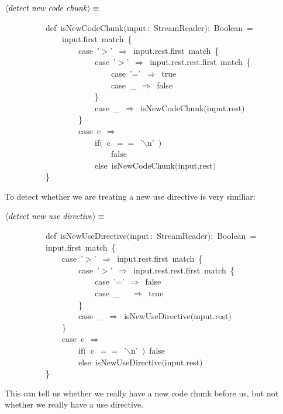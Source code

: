 \documentclass[a4paper,12pt]{article}
\begin{document}
$\left<\mbox{\emph{detect new code chunk}}\right>\equiv$
\begin{program}~~~~~~~~~~{\vem def}~isNewCodeChunk$($input\,{\rm :}~StreamReader$)${\rm :}~Boolean~=
\\~~~~~~~~~~~~~~input.first~{\vem match}~{\small\{}
\\~~~~~~~~~~~~~~~~~~{\vem case}~'$>$'~$\Rightarrow$~input.rest.first~{\vem match}~{\small\{}
\\~~~~~~~~~~~~~~~~~~~~~~{\vem case}~'$>$'~$\Rightarrow$~input.rest.rest.first~{\vem match}~{\small\{}
\\~~~~~~~~~~~~~~~~~~~~~~~~~~{\vem case}~'='~$\Rightarrow$~{\vem true}
\\~~~~~~~~~~~~~~~~~~~~~~~~~~{\vem case}~\_~$\Rightarrow$~{\vem false}
\\~~~~~~~~~~~~~~~~~~~~~~{\small\}}
\\~~~~~~~~~~~~~~~~~~~~~~{\vem case}~\_~$\Rightarrow$~isNewCodeChunk$($input.rest$)$
\\~~~~~~~~~~~~~~~~~~{\small\}}
\\~~~~~~~~~~~~~~~~~~{\vem case}~c~$\Rightarrow$
\\~~~~~~~~~~~~~~~~~~~~~~{\vem if}$($~c~$==$~'$\backslash$n'~$)$
\\~~~~~~~~~~~~~~~~~~~~~~~~~~{\vem false}
\\~~~~~~~~~~~~~~~~~~~~~~{\vem else}~isNewCodeChunk$($input.rest$)$
\\~~~~~~~~~~{\small\}}
\\[0.5em]\end{program}
To detect whether we are treating a new use directive is very similiar:

$\left<\mbox{\emph{detect new use directive}}\right>\equiv$
\begin{program}~~~~~~~~~~{\vem def}~isNewUseDirective$($input\,{\rm :}~StreamReader$)${\rm :}~Boolean~=
\\~~~~~~~~~~input.first~{\vem match}~{\small\{}
\\~~~~~~~~~~~~~~{\vem case}~'$>$'~$\Rightarrow$~input.rest.first~{\vem match}~{\small\{}
\\~~~~~~~~~~~~~~~~~~{\vem case}~'$>$'~$\Rightarrow$~input.rest.rest.first~{\vem match}~{\small\{}
\\~~~~~~~~~~~~~~~~~~~~~~{\vem case}~'='~$\Rightarrow$~{\vem false}
\\~~~~~~~~~~~~~~~~~~~~~~{\vem case}~\_~~~$\Rightarrow$~{\vem true}
\\~~~~~~~~~~~~~~~~~~{\small\}}
\\~~~~~~~~~~~~~~~~~~{\vem case}~\_~$\Rightarrow$~isNewUseDirective$($input.rest$)$
\\~~~~~~~~~~~~~~{\small\}}
\\~~~~~~~~~~~~~~{\vem case}~c~$\Rightarrow$
\\~~~~~~~~~~~~~~~~~~{\vem if}$($~c~$==$~'$\backslash$n'~$)$~{\vem false}
\\~~~~~~~~~~~~~~~~~~{\vem else}~isNewUseDirective$($input.rest$)$
\\~~~~~~~~~~{\small\}}
\\[0.5em]\end{program}
This can tell us whether we really have a new code chunk before us,
but not whether we really have a use directive.
\end{document}

